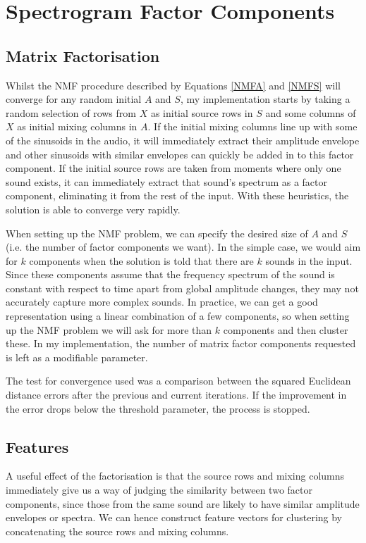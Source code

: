 \documentclass[12pt,a4paper,twoside,openright]{report}
\begin{document}
\section{Spectrogram Factor Components}

\subsection{Matrix Factorisation}

Whilst the NMF procedure described by Equations \ref{NMFA} and \ref{NMFS} will converge for any random initial $ A $ and $ S $, my implementation starts by taking a random selection of rows from $ X $ as initial source rows in $ S $ and some columns of $ X $ as initial mixing columns in $ A $. If the initial mixing columns line up with some of the sinusoids in the audio, it will immediately extract their amplitude envelope and other sinusoids with similar envelopes can quickly be added in to this factor component. If the initial source rows are taken from moments where only one sound exists, it can immediately extract that sound's spectrum as a factor component, eliminating it from the rest of the input. With these heuristics, the solution is able to converge very rapidly.

When setting up the NMF problem, we can specify the desired size of $ A $ and $ S $ (i.e. the number of factor components we want). In the simple case, we would aim for $ k $ components when the solution is told that there are $ k $ sounds in the input. Since these components assume that the frequency spectrum of the sound is constant with respect to time apart from global amplitude changes, they may not accurately capture more complex sounds. In practice, we can get a good representation using a linear combination of a few components, so when setting up the NMF problem we will ask for more than $ k $ components and then cluster these. In my implementation, the number of matrix factor components requested is left as a modifiable parameter.

The test for convergence used was a comparison between the squared Euclidean distance errors after the previous and current iterations. If the improvement in the error drops below the threshold parameter, the process is stopped.

\subsection{Features}

A useful effect of the factorisation is that the source rows and mixing columns immediately give us a way of judging the similarity between two factor components, since those from the same sound are likely to have similar amplitude envelopes or spectra. We can hence construct feature vectors for clustering by concatenating the source rows and mixing columns.
\end{document}
